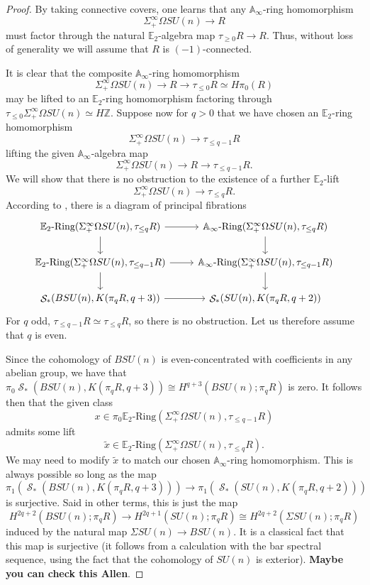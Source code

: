 \documentclass[reqno, oneside]{amsart}
\theoremstyle{definition}
\theoremstyle{plain}
\DeclareMathOperator{\cS}{\mathcal{S}}
\begin{document}
\begin{proof} 
By taking connective covers, one learns that any $\mathbb{A}_\infty$-ring homomorphism
$$\Sigma^{\infty}_+ \Omega SU(n) \rightarrow R$$
must factor through the natural $\mathbb{E}_2$-algebra map $\tau_{\ge 0} R \rightarrow R$.  Thus, without loss of generality we will assume that $R$ is $(-1)$-connected.

It is clear that the composite $\mathbb{A}_\infty$-ring homomorphism
$$\Sigma^{\infty}_+ \Omega SU(n) \longrightarrow R \longrightarrow \tau_{\le 0} R \simeq H\pi_0(R)$$
may be lifted to an $\mathbb{E}_2$-ring homomorphism factoring through $\tau_{\le 0} \Sigma^{\infty}_+ \Omega SU(n) \simeq H\mathbb{Z}$.   Suppose now for $q>0$ that we have chosen an $\mathbb{E}_2$-ring homomorphism 
$$\Sigma^{\infty}_+ \Omega SU(n) \longrightarrow \tau_{\le q-1} R$$
lifting the given $\mathbb{A}_\infty$-algebra map
$$\Sigma^{\infty}_+ \Omega SU(n) \longrightarrow R \longrightarrow \tau_{\le q-1} R.$$
We will show that there is no obstruction to the existence of a further $\mathbb{E}_2$-lift $$\Sigma^{\infty}_+ \Omega SU(n) \longrightarrow \tau_{\le q} R.$$
According to \cite[Theorem $4.1$]{ChadwickMandell}, there is a diagram of principal fibrations
$$
\begin{tikzcd}
\mathbb{E}_2\text{-Ring}(\Sigma^{\infty}_+ \Omega SU(n), \tau_{\le q} R) \arrow{r} \arrow{d} & \mathbb{A}_\infty\text{-Ring}(\Sigma^{\infty}_+ \Omega SU(n), \tau_{\le q} R) \arrow{d} \\
\mathbb{E}_2\text{-Ring}(\Sigma^{\infty}_+ \Omega SU(n), \tau_{\le q-1} R) \arrow{r} \arrow{d} & \mathbb{A}_\infty\text{-Ring}(\Sigma^{\infty}_+ \Omega SU(n), \tau_{\le q-1} R) \arrow{d} \\
\cS_*(BSU(n),K(\pi_q R,q+3)) \arrow{r} & \cS_*(SU(n),K(\pi_q R,q+2))
\end{tikzcd}
$$
For $q$ odd, $\tau_{\le q-1} R \simeq \tau_{\le q} R$, so there is no obstruction.  Let us therefore assume that $q$ is even.

Since the cohomology of $BSU(n)$ is even-concentrated with coefficients in any abelian group, we have that $\pi_0 \cS_*(BSU(n),K(\pi_q R,q+3)) \cong H^{q+3}(BSU(n);\pi_q R)$ is zero.  It follows then that the given class $$x \in \pi_0 \mathbb{E}_2\text{-Ring}(\Sigma^{\infty}_+ \Omega SU(n), \tau_{\le q-1} R)$$ admits some lift $$\widetilde{x} \in \mathbb{E}_2\text{-Ring}(\Sigma^{\infty}_+ \Omega SU(n), \tau_{\le q} R).$$  We may need to modify $\widetilde{x}$ to match our chosen $\mathbb{A}_\infty$-ring homomorphism.  This is always possible so long as the map
$$\pi_1(\cS_*(BSU(n),K(\pi_q R,q+3))) \longrightarrow \pi_1(\cS_*(SU(n),K(\pi_q R,q+2)))$$
is surjective.  Said in other terms, this is just the map
$$H^{2q+2}(BSU(n);\pi_q R) \longrightarrow H^{2q+1}(SU(n);\pi_q R) \cong H^{2q+2}(\Sigma SU(n);\pi_q R)$$
induced by the natural map $\Sigma SU(n) \rightarrow BSU(n)$.  It is a classical fact that this map is surjective (it follows from a calculation with the bar spectral sequence, using the fact that the cohomology of $SU(n)$ is exterior). \textbf{Maybe you can check this Allen}.
\end{proof}
\end{document}
